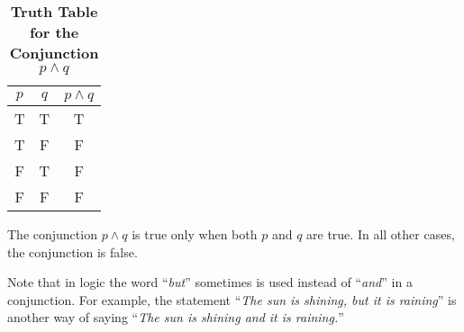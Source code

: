 \begin{table}[h!]
\centering
\caption*{\textbf{Truth Table for the Conjunction $p \land q$}}
\begin{tabular}{|c|c!{\vrule width 1.5pt}c|}
\hline
{}
\textbf{$p$} & \textbf{$q$} & \textbf{$p \land q$} \\
\hline
T & T & T \\
T & F & F \\
F & T & F \\
F & F & F \\
\hline
\end{tabular}
\end{table}

\begin{tcolorbox}[colback=white, colframe=gray!60, title=Remark 1]
The conjunction $p \land q$ is true only when both $p$ and $q$ are true. In all other cases, the conjunction is false.
\end{tcolorbox}
\begin{tcolorbox}[colback=white, colframe=gray!60, title=Remark 2]
Note that in logic the word “\textit{but}” sometimes is used instead of “\textit{and}” in a conjunction. For
example, the statement “\textit{The sun is shining, but it is raining}” is another way of saying “\textit{The sun
is shining and it is raining.}”
\end{tcolorbox}


